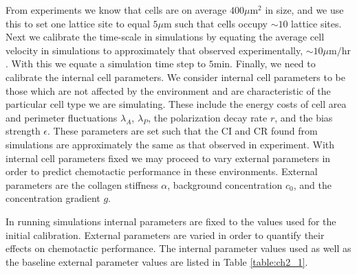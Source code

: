 From experiments we know that cells are on average $400 \mu\text{m}^2$ in size, and we use this to set one lattice site to equal $5 \mu\text{m}$ such that cells occupy $\sim 10$ lattice sites. Next we calibrate the time-scale in simulations by equating the average cell velocity in simulations to approximately that observed experimentally, $\sim 10 \mu\text{m/hr}$. With this we equate a simulation time step to $5 \text{min}$. Finally, we need to calibrate the internal cell parameters. We consider internal cell parameters to be those which are not affected by the environment and are characteristic of the particular cell type we are simulating.
These include the energy costs of cell area and perimeter fluctuations $\lambda_A$, $\lambda_P$, the polarization decay rate $r$, and the bias strength $\epsilon$. These parameters are set such that the CI and CR found from simulations are approximately the same as that observed in experiment. With internal cell parameters fixed we may proceed to vary external parameters in order to predict chemotactic performance in these environments. External parameters are the collagen stiffness $\alpha$, background concentration $c_0$, and the concentration gradient $g$.


In running simulations internal parameters are fixed to the values used for the initial calibration. External parameters are varied in order to quantify their effects on chemotactic performance. The internal parameter values used as well as the baseline external parameter values are listed in Table \ref{table:ch2_1}.


